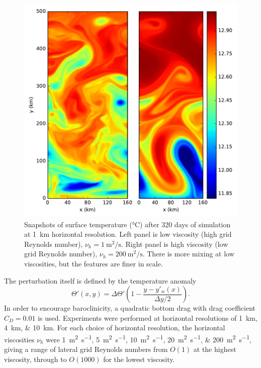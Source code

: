 \begin{figure}
  \includegraphics{../plots/eddies_snapshot_dx1.pdf}
  \caption{\label{fig:eddies-snapshot} Snapshots of surface temperature (\si{\celsius}) after 320 days of simulation at \SI{1}{\kilo\metre} horizontal resolution. Left panel is low viscosity (high grid Reynolds number), $\nu_h = \SI{1}{\square\metre\per\second}$. Right panel is high viscosity (low grid Reynolds number), $\nu_h = \SI{200}{\square\metre\per\second}$. There is more mixing at low viscosities, but the features are finer in scale.}
\end{figure}

The perturbation itself is defined by the temperature anomaly
%
\begin{equation}
  \Theta'(x,y) = \Delta\Theta'\left(1 - \frac{y - y'_w(x)}{\Delta y / 2}\right).
\end{equation}
%
In order to encourage baroclinicity, a quadratic bottom drag with drag coefficient $C_D = 0.01$ is used. Experiments were performed at horizontal resolutions of \SIlist{1;4;10}{\kilo\metre}. For each choice of horizontal resolution, the horizontal viscosities $\nu_h$ were \SIlist{1;5;10;20;200}{\square\metre\per\second}, giving a range of lateral grid Reynolds numbers from $O(1)$ at the highest viscosity, through to $O(1000)$ for the lowest viscosity.

